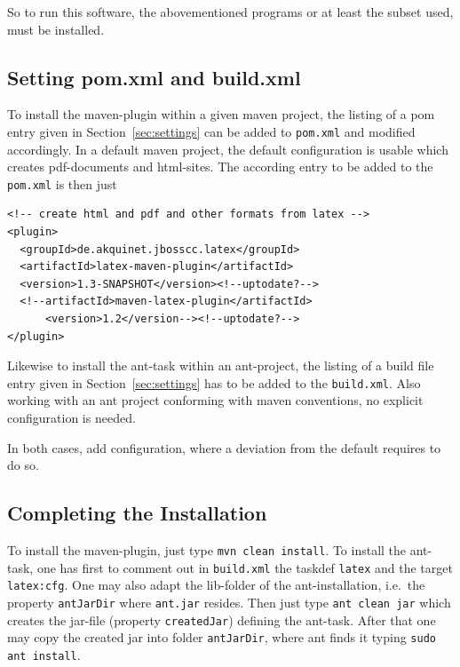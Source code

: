 \documentclass[12pt]{article}
\begin{document}
So to run this software, the abovementioned programs 
or at least the subset used, must be installed. 

\subsection{Setting pom.xml and build.xml}\label{subsec:sgml}

To install the maven-plugin within a given maven project, 
the listing of a pom entry given in Section~\ref{sec:settings} 
can be added to {\tt pom.xml} and modified accordingly. 
In a default maven project, 
the default configuration is usable which creates pdf-documents and
\gls{html}-sites. 
The according entry to be added to the {\tt pom.xml} is then just 
%
\lstset{language=xml, basicstyle=\small}
\begin{lstlisting}
<!-- create html and pdf and other formats from latex -->
<plugin>
  <groupId>de.akquinet.jbosscc.latex</groupId>
  <artifactId>latex-maven-plugin</artifactId>
  <version>1.3-SNAPSHOT</version><!--uptodate?-->
  <!--artifactId>maven-latex-plugin</artifactId>
      <version>1.2</version--><!--uptodate?-->
</plugin>
\end{lstlisting}

Likewise to install the ant-task within an ant-project, 
the listing of a build file entry given in Section~\ref{sec:settings} 
has to be added to the {\tt build.xml}. 
Also working with an ant project 
conforming with maven conventions, 
no explicit configuration is needed. 

In both cases, add configuration, 
where a deviation from the default requires to do so. 



\subsection{Completing the Installation}\label{subsec:instComplete}

To install the maven-plugin, just type {\tt mvn clean install}. 
To install the ant-task, one has first to comment out in {\tt build.xml} 
the taskdef {\tt latex} and the target {\tt latex:cfg}. 
One may also adapt the lib-folder of the ant-installation, 
i.e.~the property {\tt antJarDir} where {\tt ant.jar} resides. 
Then just type {\tt ant clean jar} 
which creates the jar-file (property {\tt createdJar}) defining the ant-task. 
After that one may copy the created jar into folder {\tt antJarDir}, 
where ant finds it typing {\tt sudo ant install}. 
\end{document}

